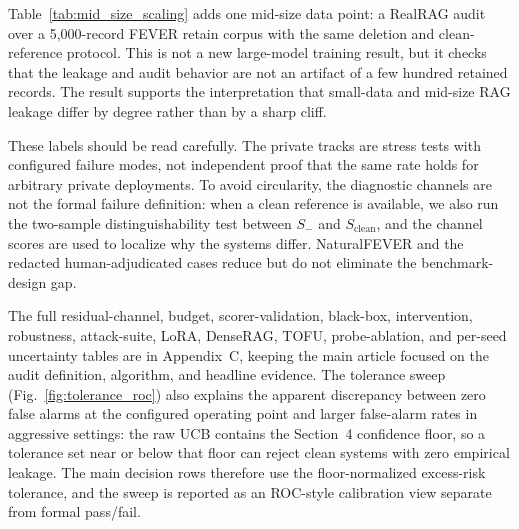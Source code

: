\documentclass[10pt,journal,compsoc]{IEEEtran}
\begin{document}
Table~\ref{tab:mid_size_scaling} adds one mid-size data point: a RealRAG audit over a 5,000-record FEVER retain corpus with the same deletion and clean-reference protocol. This is not a new large-model training result, but it checks that the leakage and audit behavior are not an artifact of a few hundred retained records. The result supports the interpretation that small-data and mid-size RAG leakage differ by degree rather than by a sharp cliff.

These labels should be read carefully. The private tracks are stress tests with configured failure modes, not independent proof that the same rate holds for arbitrary private deployments. To avoid circularity, the diagnostic channels are not the formal failure definition: when a clean reference is available, we also run the two-sample distinguishability test between $S_-$ and $S_{\mathrm{clean}}$, and the channel scores are used to localize why the systems differ. NaturalFEVER and the redacted human-adjudicated cases reduce but do not eliminate the benchmark-design gap.

The full residual-channel, budget, scorer-validation, black-box, intervention, robustness, attack-suite, LoRA, DenseRAG, TOFU, probe-ablation, and per-seed uncertainty tables are in Appendix~C, keeping the main article focused on the audit definition, algorithm, and headline evidence. The tolerance sweep (Fig.~\ref{fig:tolerance_roc}) also explains the apparent discrepancy between zero false alarms at the configured operating point and larger false-alarm rates in aggressive settings: the raw UCB contains the Section~4 confidence floor, so a tolerance set near or below that floor can reject clean systems with zero empirical leakage. The main decision rows therefore use the floor-normalized excess-risk tolerance, and the sweep is reported as an ROC-style calibration view separate from formal pass/fail.
\end{document}
